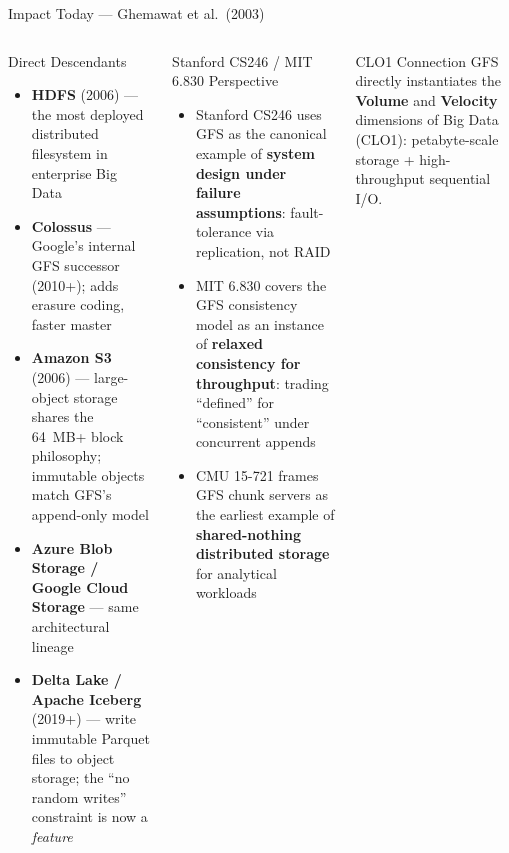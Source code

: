 \documentclass[aspectratio=169,10pt]{beamer}
\begin{document}
\begin{frame}{Impact Today — Ghemawat et al.\ (2003)}
  \begin{columns}[T]
      \begin{block}{Direct Descendants}
        \begin{itemize}
          \item \textbf{HDFS} (2006) — the most deployed distributed
                filesystem in enterprise Big Data
          \item \textbf{Colossus} — Google's internal GFS successor
                (2010+); adds erasure coding, faster master
          \item \textbf{Amazon S3} (2006) — large-object storage shares
                the 64~MB+ block philosophy; immutable objects match
                GFS's append-only model
          \item \textbf{Azure Blob Storage / Google Cloud Storage} —
                same architectural lineage
          \item \textbf{Delta Lake / Apache Iceberg} (2019+) — write
                immutable Parquet files to object storage;
                the ``no random writes'' constraint is now a \emph{feature}
        \end{itemize}
      \end{block}

      \begin{exampleblock}{Stanford CS246 / MIT 6.830 Perspective}
        \begin{itemize}
          \item Stanford CS246 uses GFS as the canonical example of
                \textbf{system design under failure assumptions}:
                fault-tolerance via replication, not RAID
          \item MIT 6.830 covers the GFS consistency model as an
                instance of \textbf{relaxed consistency for throughput}:
                trading ``defined'' for ``consistent'' under concurrent appends
          \item CMU 15-721 frames GFS chunk servers as the earliest
                example of \textbf{shared-nothing distributed storage}
                for analytical workloads
        \end{itemize}
      \end{exampleblock}
      \vspace{4pt}
      \begin{alertblock}{CLO1 Connection}
        GFS directly instantiates the \textbf{Volume} and
        \textbf{Velocity} dimensions of Big Data (CLO1):
        petabyte-scale storage + high-throughput sequential I/O.
      \end{alertblock}
  \end{columns}
\end{frame}
\end{document}
